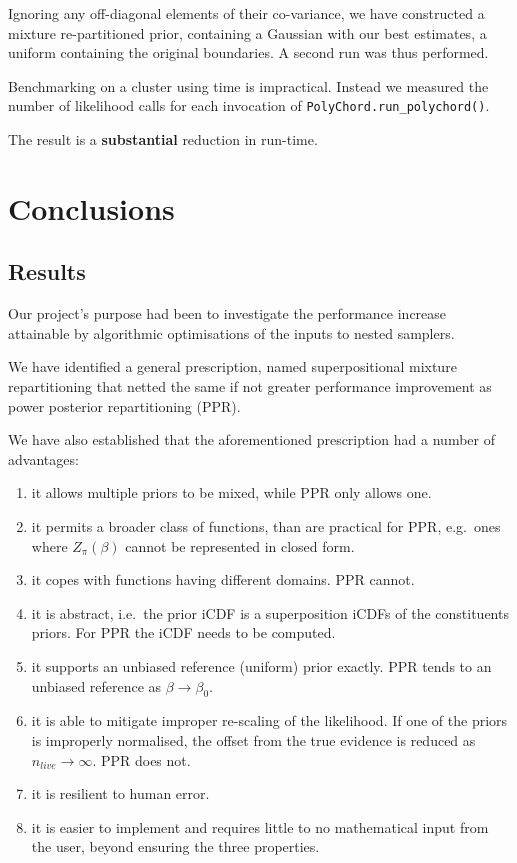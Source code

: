 \documentclass[usenatbib]{mnras}
\begin{document}
Ignoring any off-diagonal elements of their co-variance, we have
constructed a mixture re-partitioned prior, containing a Gaussian
with our best estimates, a uniform containing the original
boundaries. A second run was thus performed.

Benchmarking on a cluster using time is impractical. Instead we
measured the number of likelihood calls for each invocation of
\texttt{PolyChord.run\_polychord()}.

The result is a \textbf{substantial} reduction in run-time.




\section{Conclusions}\label{sec:orgdf2cbd9}

\subsection{Results}\label{sec:orgc48c55d}
Our project's purpose had been to investigate the performance
increase attainable by algorithmic optimisations of the inputs to
nested samplers.

We have identified a general prescription, named superpositional
mixture repartitioning that netted the same if not greater
performance improvement as power posterior repartitioning (PPR).

We have also established that the aforementioned prescription had a
number of advantages:
\begin{enumerate}
\item it allows multiple priors to be mixed, while PPR only allows
one.
\item it permits a broader class of functions, than are practical for
PPR, e.g.~ones where \(Z_{\pi}(\beta)\) cannot be represented in
closed form.
\item it copes with functions having different domains. PPR cannot.
\item it is abstract, i.e.~the prior iCDF is a superposition iCDFs of
the constituents priors. For PPR the iCDF needs to be computed.
\item it supports an unbiased reference (uniform) prior exactly. PPR
tends to an unbiased reference as \(\beta\rightarrow\beta_{0}\).
\item it is able to mitigate improper re-scaling of the likelihood. If
one of the priors is improperly normalised, the offset from the
true evidence is reduced as \(n_{live}\rightarrow\infty\). PPR
does not.
\item it is resilient to human error.
\item it is easier to implement and requires little to no mathematical
input from the user, beyond ensuring the three properties.
\end{enumerate}
\end{document}
